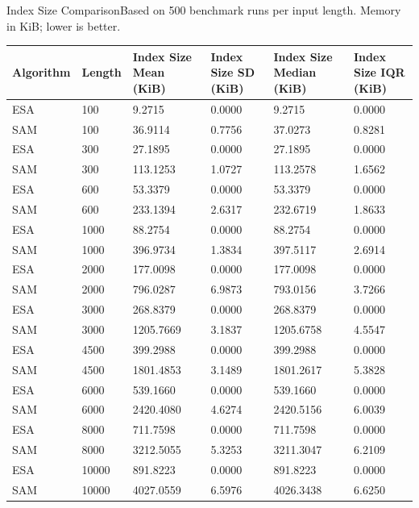 \begin{benchmarktable}{Index Size Comparison}{Based on 500 benchmark runs per input length. Memory in KiB; lower is better.}
\begin{tabularx}{\textwidth}{|X|X|X|X|X|X|}
\toprule
Algorithm & Length & Index Size Mean (KiB) & Index Size SD (KiB) & Index Size Median (KiB) & Index Size IQR (KiB) \\
\midrule
ESA & 100 & 9.2715 & 0.0000 & 9.2715 & 0.0000 \\
SAM & 100 & 36.9114 & 0.7756 & 37.0273 & 0.8281 \\
\hline
ESA & 300 & 27.1895 & 0.0000 & 27.1895 & 0.0000 \\
SAM & 300 & 113.1253 & 1.0727 & 113.2578 & 1.6562 \\
\hline
ESA & 600 & 53.3379 & 0.0000 & 53.3379 & 0.0000 \\
SAM & 600 & 233.1394 & 2.6317 & 232.6719 & 1.8633 \\
\hline
ESA & 1000 & 88.2754 & 0.0000 & 88.2754 & 0.0000 \\
SAM & 1000 & 396.9734 & 1.3834 & 397.5117 & 2.6914 \\
\hline
ESA & 2000 & 177.0098 & 0.0000 & 177.0098 & 0.0000 \\
SAM & 2000 & 796.0287 & 6.9873 & 793.0156 & 3.7266 \\
\hline
ESA & 3000 & 268.8379 & 0.0000 & 268.8379 & 0.0000 \\
SAM & 3000 & 1205.7669 & 3.1837 & 1205.6758 & 4.5547 \\
\hline
ESA & 4500 & 399.2988 & 0.0000 & 399.2988 & 0.0000 \\
SAM & 4500 & 1801.4853 & 3.1489 & 1801.2617 & 5.3828 \\
\hline
ESA & 6000 & 539.1660 & 0.0000 & 539.1660 & 0.0000 \\
SAM & 6000 & 2420.4080 & 4.6274 & 2420.5156 & 6.0039 \\
\hline
ESA & 8000 & 711.7598 & 0.0000 & 711.7598 & 0.0000 \\
SAM & 8000 & 3212.5055 & 5.3253 & 3211.3047 & 6.2109 \\
\hline
ESA & 10000 & 891.8223 & 0.0000 & 891.8223 & 0.0000 \\
SAM & 10000 & 4027.0559 & 6.5976 & 4026.3438 & 6.6250 \\
\bottomrule
\end{tabularx}
\end{benchmarktable}